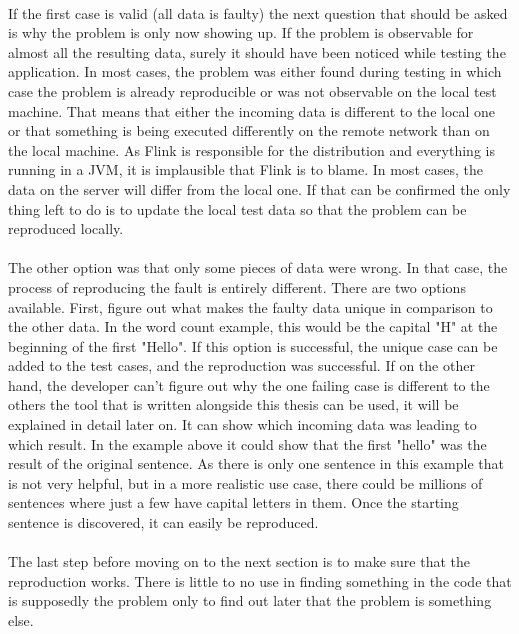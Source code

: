 \paragraph{} If the first case is valid (all data is faulty) the next question that should be asked is why the problem is only now showing up. If the problem is observable for almost all the resulting data, surely it should have been noticed while testing the application. In most cases, the problem was either found during testing in which case the problem is already reproducible or was not observable on the local test machine. That means that either the incoming data is different to the local one or that something is being executed differently on the remote network than on the local machine. As Flink is responsible for the distribution and everything is running in a JVM, it is implausible that Flink is to blame. In most cases, the data on the server will differ from the local one. If that can be confirmed the only thing left to do is to update the local test data so that the problem can be reproduced locally.

\paragraph{} The other option was that only some pieces of data were wrong. In that case, the process of reproducing the fault is entirely different. There are two options available. First, figure out what makes the faulty data unique in comparison to the other data. In the word count example, this would be the capital "H" at the beginning of the first "Hello". If this option is successful, the unique case can be added to the test cases, and the reproduction was successful. If on the other hand, the developer can't figure out why the one failing case is different to the others the tool that is written alongside this thesis can be used, it will be explained in detail later on. It can show which incoming data was leading to which result. In the example above it could show that the first "hello" was the result of the original sentence. As there is only one sentence in this example that is not very helpful, but in a more realistic use case, there could be millions of sentences where just a few have capital letters in them. Once the starting sentence is discovered, it can easily be reproduced.

\paragraph{} The last step before moving on to the next section is to make sure that the reproduction works. There is little to no use in finding something in the code that is supposedly the problem only to find out later that the problem is something else.

